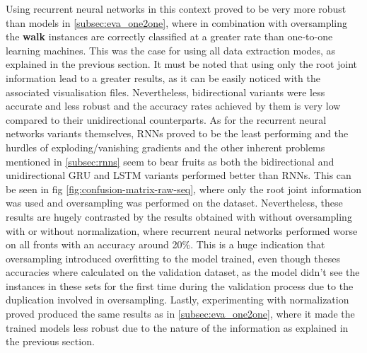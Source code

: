 		Using recurrent neural networks in this context proved to be very more robust than models in \ref{subsec:eva_one2one}, where in combination with oversampling the \textbf{walk} instances are correctly classified at a greater rate than one-to-one learning machines. This was the case for using all data extraction modes, as explained in the previous section. It must be noted that using only the root joint information lead to a greater results, as it can be easily noticed with the associated visualisation files. Nevertheless, bidirectional variants were less accurate and less robust and the accuracy rates achieved by them is very low compared to their unidirectional counterparts. As for the recurrent neural networks variants themselves, RNNs proved to be the least performing and the hurdles of exploding/vanishing gradients and the other inherent problems mentioned in \ref{subsec:rnns} seem to bear fruits as both the bidirectional and unidirectional GRU and LSTM variants performed better than RNNs. This can be seen in fig \ref{fig:confusion-matrix-raw-seq}, where only the root joint information was used and oversampling was performed on the dataset. Nevertheless, these results are hugely contrasted by the results obtained with without oversampling with or without normalization, where recurrent neural networks performed worse on all fronts with an accuracy around 20\%. This is a huge indication that oversampling introduced overfitting to the model trained, even though theses accuracies where calculated on the validation dataset, as the model didn't see the instances in these sets for the first time during the validation process due to the duplication involved in oversampling. Lastly, experimenting with normalization proved produced the same results as in \ref{subsec:eva_one2one}, where it made the trained models less robust due to the nature of the information as explained in the previous section. %
